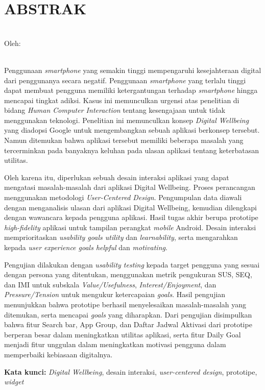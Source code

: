 \clearpage
\chapter*{ABSTRAK}

\begin{center}
  \textbf{\MakeUppercase{\thetitle}} \\[1em]
  
  Oleh: \\
  \MakeUppercase{\theauthor} \\
\end{center}

\begin{singlespace}
  Penggunaan \textit{smartphone} yang semakin tinggi mempengaruhi kesejahteraan digital dari penggunanya secara negatif.
  Penggunaan \textit{smartphone} yang terlalu tinggi dapat membuat pengguna memiliki ketergantungan terhadap \textit{smartphone} hingga mencapai tingkat adiksi.
  Kasus ini memunculkan urgensi atas penelitian di bidang \textit{Human Computer Interaction} tentang kesengajaan untuk tidak menggunakan teknologi.
  Penelitian ini memunculkan konsep \textit{Digital Wellbeing} yang diadopsi Google untuk mengembangkan sebuah aplikasi berkonsep tersebut.
  Namun ditemukan bahwa aplikasi tersebut memiliki beberapa masalah yang tercerminkan pada banyaknya keluhan pada ulasan aplikasi tentang keterbatasan utilitas.
  
  Oleh karena itu, diperlukan sebuah desain interaksi aplikasi yang dapat mengatasi masalah-masalah dari aplikasi Digital Wellbeing.
  Proses perancangan menggunakan metodologi \textit{User-Centered Design}.
  Pengumpulan data diawali dengan menganalisis ulasan dari aplikasi Digital Wellbeing, kemudian dilengkapi dengan wawancara kepada pengguna aplikasi.
  Hasil tugas akhir berupa prototipe \textit{high-fidelity} aplikasi untuk tampilan perangkat \textit{mobile} Android.
  Desain interaksi memprioritaskan \textit{usability goals utility} dan \textit{learnability}, serta mengarahkan kepada \textit{user experience goals helpful} dan \textit{motivating}.
  
  Pengujian dilakukan dengan \textit{usability testing} kepada target pengguna yang sesuai dengan persona yang ditentukan, menggunakan metrik pengukuran SUS, SEQ, dan IMI untuk subskala \textit{Value/Usefulness}, \textit{Interest/Enjoyment}, dan \textit{Pressure/Tension} untuk mengukur ketercapaian \textit{goals}.
  Hasil pengujian menunjukkan bahwa prototipe berhasil menyelesaikan masalah-masalah yang ditemukan, serta mencapai \textit{goals} yang diharapkan.
  Dari pengujian disimpulkan bahwa fitur Search bar, App Group, dan Daftar Jadwal Aktivasi dari prototipe berperan besar dalam meningkatkan utilitas aplikasi, serta fitur Daily Goal menjadi fitur unggulan dalam meningkatkan motivasi pengguna dalam memperbaiki kebiasaan digitalnya.

\noindent \textbf{Kata kunci:} \textit{Digital Wellbeing}, desain interaksi, \textit{user-centered design}, prototipe, \textit{widget}
\end{singlespace}
